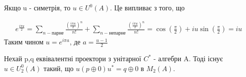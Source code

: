 \begin{remark}
    Якщо u - симетрія, то $u \in U^0(A)$.
    Це випливає з того, що

    \begin{multline*}
        e^{\frac{i \pi u}{2}} =
        \sum_{n - \text{парне}} \frac{(\frac{i \pi u}{2})^n}{n!} +
        \sum_{n - \text{непарне}} \frac{(\frac{i \pi u}{2})^n}{n!} =
        \cos (\frac{\pi}{2}) + iu \sin(\frac{\pi}{2}) = iu
    \end{multline*}
    Таким чином $u = e^{i \pi a}$, де $a = \frac{u-1}{2}$
\end{remark}

\begin{lemma}
    Нехай p,q еквівалентні проектори з унітарної $C^*$ - алгебри A.
    Тоді існує $u \in U^0_2(A)$ такий, що $u(p \oplus 0)u^* = q \oplus 0$
    в $M_2(A)$.


\end{lemma}
